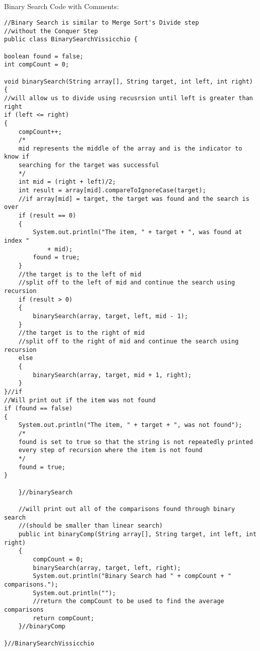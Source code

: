 \documentclass[letterpaper, 10pt]{article}
\begin{document}
\subsection{}
Binary Search Code with Comments: \\
\begin{lstlisting}
//Binary Search is similar to Merge Sort's Divide step 
//without the Conquer Step
public class BinarySearchVissicchio {

boolean found = false;
int compCount = 0;

void binarySearch(String array[], String target, int left, int right)
{
//will allow us to divide using recusrsion until left is greater than right
if (left <= right)
{
    compCount++;
    /*
    mid represents the middle of the array and is the indicator to know if 
    searching for the target was successful
    */
    int mid = (right + left)/2;
    int result = array[mid].compareToIgnoreCase(target);
    //if array[mid] = target, the target was found and the search is over
    if (result == 0)
    {
        System.out.println("The item, " + target + ", was found at index " 
            + mid);
        found = true;
    }
    //the target is to the left of mid
    //split off to the left of mid and continue the search using recursion
    if (result > 0)
    {
        binarySearch(array, target, left, mid - 1); 
    }
    //the target is to the right of mid
    //split off to the right of mid and continue the search using recursion
    else
    {
        binarySearch(array, target, mid + 1, right);
    }
}//if
//Will print out if the item was not found
if (found == false)
{
    System.out.println("The item, " + target + ", was not found");
    /*
    found is set to true so that the string is not repeatedly printed 
    every step of recursion where the item is not found
    */
    found = true;
}

    }//binarySearch

    //will print out all of the comparisons found through binary search 
    //(should be smaller than linear search)
    public int binaryComp(String array[], String target, int left, int right)
    {
        compCount = 0;
        binarySearch(array, target, left, right);
        System.out.println("Binary Search had " + compCount + " comparisons.");
        System.out.println("");
        //return the compCount to be used to find the average comparisons
        return compCount;
    }//binaryComp

}//BinarySearchVissicchio
\end{lstlisting}
\\
\end{document}
